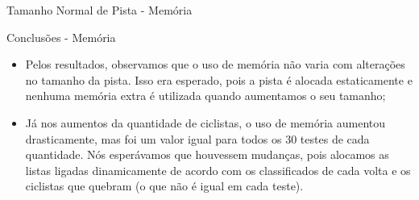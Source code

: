 \documentclass[10pt]{beamer}
\begin{document}
    \begin{frame}{Tamanho Normal de Pista - Memória}
    \end{frame}

    \begin{frame}{Conclusões - Memória}
      \begin{itemize}
        \justifying
        \item Pelos resultados, observamos que o uso de memória não varia com
          alterações no tamanho da pista. Isso era esperado, pois a pista é
          alocada estaticamente e nenhuma memória extra é utilizada quando
          aumentamos o seu tamanho;
        \item Já nos aumentos da quantidade de ciclistas, o uso de memória
          aumentou drasticamente, mas foi um valor igual para todos os 30 testes
          de cada quantidade. Nós esperávamos que houvessem mudanças, pois
          alocamos as listas ligadas dinamicamente de acordo com os
          classificados de cada volta e os ciclistas que quebram (o que não é
          igual em cada teste).
      \end{itemize}
    \end{frame}
\end{document}

